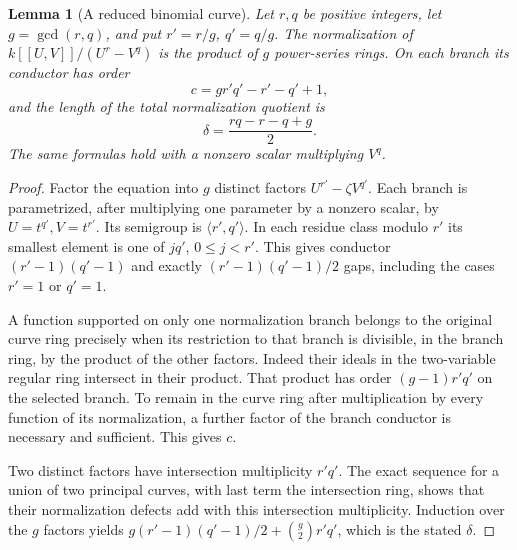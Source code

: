 \documentclass[11pt,reqno]{amsart}
\numberwithin{equation}{section}
\newtheorem{lemma}[theorem]{Lemma}
\theoremstyle{definition}\newtheorem{definition}[theorem]{Definition}
\theoremstyle{remark}\newtheorem{remark}[theorem]{Remark}
\begin{document}
\begin{lemma}[A reduced binomial curve]\label{lem:binomial-conductor-v170}
Let $r,q$ be positive integers, let $g=\gcd(r,q)$, and put
$r'=r/g$, $q'=q/g$. The normalization of
$k[[U,V]]/(U^r-V^q)$ is the product of $g$ power-series rings.
On each branch its conductor has order
\[
 c=g r'q'-r'-q'+1,
\]
and the length of the total normalization quotient is
\[
 \delta=\frac{rq-r-q+g}{2}.
\]
The same formulas hold with a nonzero scalar multiplying $V^q$.
\end{lemma}
\begin{proof}
Factor the equation into $g$ distinct factors
$U^{r'}-\zeta V^{q'}$. Each branch is parametrized, after multiplying
one parameter by a nonzero scalar, by
$U=t^{q'}, V=t^{r'}$. Its semigroup is
$\langle r',q'\rangle$. In each residue class modulo $r'$ its
smallest element is one of $j q'$, $0\leq j<r'$. This gives conductor
$(r'-1)(q'-1)$ and exactly $(r'-1)(q'-1)/2$ gaps, including the
cases $r'=1$ or $q'=1$.

A function supported on only one normalization branch belongs to the
original curve ring precisely when its restriction to that branch
is divisible, in the branch ring, by the product of the other factors.
Indeed their ideals in the two-variable regular ring intersect in
their product. That product has order $(g-1)r'q'$ on the selected
branch. To remain in the curve ring after multiplication by every
function of its normalization, a further factor of the branch
conductor is necessary and sufficient. This gives $c$.

Two distinct factors have intersection multiplicity $r'q'$.
The exact sequence for a union of two principal curves, with last
term the intersection ring, shows that their normalization defects
add with this intersection multiplicity. Induction over the $g$
factors yields
$g(r'-1)(q'-1)/2+\binom g2r'q'$, which is the stated $\delta$.
\end{proof}
\end{document}
